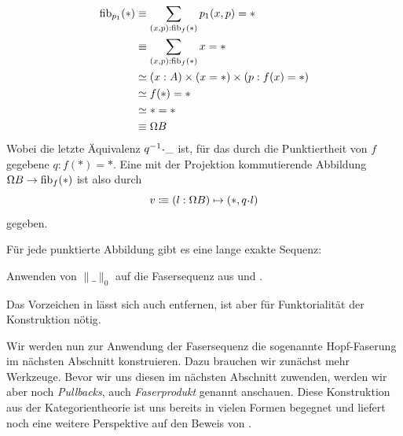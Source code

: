 \begin{beweis}
  \begin{align*}
    \mathrm{fib}_{p_1}(\ast)&\equiv \sum_{(x,p):\mathrm{fib}_f(\ast)}p_1(x,p)=\ast \\
    &\equiv \sum_{(x,p):\mathrm{fib}_f(\ast)}x=\ast \\
    &\simeq (x:A)\times (x=\ast)\times (p:f(x)=\ast) \\
    &\simeq f(\ast)=\ast \\
    &\simeq \ast=\ast \\
    &\equiv \Omega B 
  \end{align*}
  Wobei die letzte Äquivalenz \(q^{-1}\kon\_\) ist, für das durch die Punktiertheit von \(f\) gegebene \(q:f(\ast)=\ast\).
  Eine mit der Projektion kommutierende Abbildung \(\Omega B\to \mathrm{fib}_f(\ast)\) ist also durch
  \[v\colonequiv (l:\Omega B)\mapsto (\ast,q\kon l) \]
  gegeben.
\end{beweis}

\begin{satz}
  \label{faser-les}
  Für jede punktierte Abbildung gibt es eine lange exakte Sequenz:
  \begin{center}
  \end{center}
\end{satz}

\begin{beweis}
  Anwenden von \(\|\_\|_0\) auf die Fasersequenz aus  und .
\end{beweis}

\begin{bemerkung}
  Das Vorzeichen in  lässt sich auch entfernen, ist aber für Funktorialität der Konstruktion nötig.
\end{bemerkung}

Wir werden nun zur Anwendung der Fasersequenz die sogenannte Hopf-Faserung im nächsten Abschnitt konstruieren. Dazu brauchen wir zunächst mehr Werkzeuge.
Bevor wir uns diesen im nächsten Abschnitt zuwenden, werden wir aber noch \emph{Pullbacks}, auch \emph{Faserprodukt} genannt anschauen.
Diese Konstruktion aus der Kategorientheorie ist uns bereits in vielen Formen begegnet und liefert noch eine weitere Perspektive auf den Beweis von .

